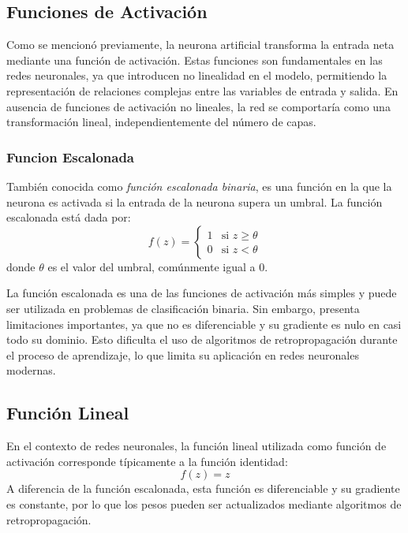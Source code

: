 \subsection{Funciones de Activación}
Como se mencionó previamente, la neurona artificial transforma la entrada neta mediante
una función de activación. Estas funciones son fundamentales en las redes neuronales,
ya que introducen no linealidad en el modelo, permitiendo la representación de relaciones
complejas entre las variables de entrada y salida. En ausencia de funciones de activación
no lineales, la red se comportaría como una transformación lineal, independientemente del
número de capas.


\subsubsection{Funcion Escalonada}
También conocida como \textit{función escalonada binaria}, es una función en la que la neurona 
es activada si la entrada de la neurona supera un umbral. La función escalonada está dada por:
\begin{equation}
    f(z) = \begin{cases}
        1 & \text{si } z \ge \theta \\
        0 & \text{si } z < \theta
    \end{cases}
\end{equation}
donde $\theta$ es el valor del umbral, comúnmente igual a $0$.
\medskip

La función escalonada es una de las funciones de activación más simples y puede ser 
utilizada en problemas de clasificación binaria. Sin embargo, presenta limitaciones 
importantes, ya que no es diferenciable y su gradiente es nulo en casi todo su dominio. 
Esto dificulta el uso de algoritmos de retropropagación durante el proceso de aprendizaje, lo que limita su aplicación en redes neuronales modernas.

\subsection{Función Lineal}
En el contexto de redes neuronales, la función lineal utilizada como función de activación 
corresponde típicamente a la función identidad:
\begin{equation}
    f(z) = z
\end{equation}
A diferencia de la función escalonada, esta función es diferenciable y su gradiente es 
constante, por lo que los pesos pueden ser actualizados mediante algoritmos de 
retropropagación.

